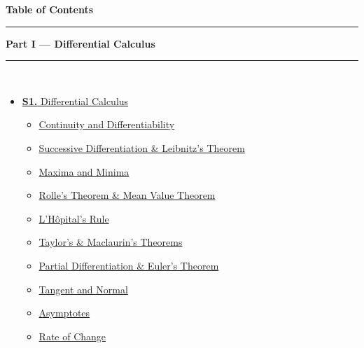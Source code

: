 \documentclass[12pt,a4paper]{article}
\begin{document}
\thispagestyle{fancy}
\begin{center}
  {\LARGE\bfseries\textcolor{pblue}{Table of Contents}}\\[6pt]
  \textcolor{pblue}{\rule{0.6\textwidth}{0.8pt}}
\end{center}
\vspace{6pt}

\begin{tcolorbox}[breakable,colback=cA!5,colframe=cA,boxrule=1pt,arc=5pt,
  left=8pt,right=8pt,top=8pt,bottom=8pt,before skip=4pt]
  {\large\bfseries\textcolor{cA}{Part I --- Differential Calculus}}\\[5pt]
  \textcolor{cA!40}{\rule{\textwidth}{0.4pt}}\\[3pt]
  \small\begin{itemize}[leftmargin=1.2em,itemsep=1pt,label={\textcolor{cA}{$\triangleright$}}]
    \item \hyperref[sec:S1]{\textbf{S1.} Differential Calculus}
      \begin{itemize}[leftmargin=1.5em,itemsep=0pt,label={\textcolor{cA}{$\cdot$}}]
        \item \hyperref[sub:s1-cont]{Continuity and Differentiability}
        \item \hyperref[sub:s1-succ]{Successive Differentiation \& Leibnitz's Theorem}
        \item \hyperref[sub:s1-maxmin]{Maxima and Minima}
        \item \hyperref[sub:s1-rolle]{Rolle's Theorem \& Mean Value Theorem}
        \item \hyperref[sub:s1-lhospital]{L'H\^{o}pital's Rule}
        \item \hyperref[sub:s1-taylor]{Taylor's \& Maclaurin's Theorems}
        \item \hyperref[sub:s1-partial]{Partial Differentiation \& Euler's Theorem}
        \item \hyperref[sub:s1-tangnorm]{Tangent and Normal}
        \item \hyperref[sub:s1-asymptotes]{Asymptotes}
        \item \hyperref[sub:s1-rateofchange]{Rate of Change}
      \end{itemize}
  \end{itemize}
\end{tcolorbox}
\end{document}
